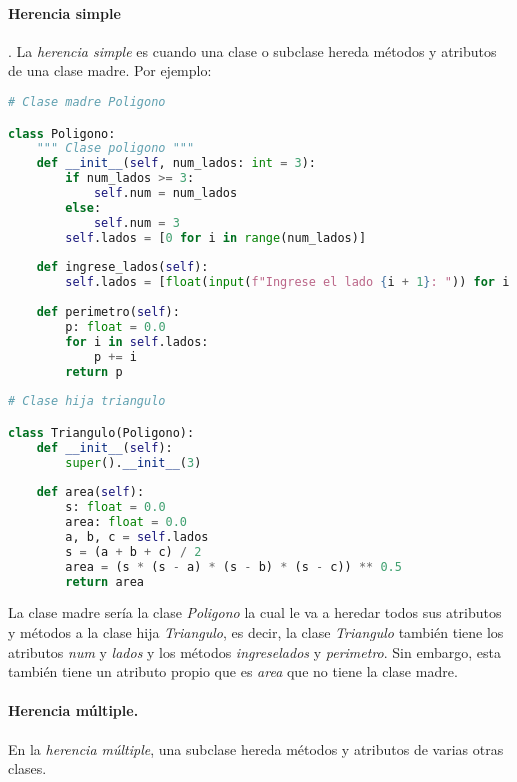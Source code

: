    \paragraph{Herencia simple}. La \emph{herencia simple} es cuando una clase o subclase hereda métodos y atributos de una clase madre. Por ejemplo:
    \begin{lstlisting}[language = {python}]
# Clase madre Poligono

class Poligono:
    """ Clase poligono """
    def __init__(self, num_lados: int = 3):
        if num_lados >= 3:
            self.num = num_lados
        else:
            self.num = 3
        self.lados = [0 for i in range(num_lados)]
        
    def ingrese_lados(self):
        self.lados = [float(input(f"Ingrese el lado {i + 1}: ")) for i in range(self.num)]
        
    def perimetro(self):
        p: float = 0.0
        for i in self.lados:
            p += i
        return p
        
# Clase hija triangulo

class Triangulo(Poligono):
    def __init__(self):
        super().__init__(3)
        
    def area(self):
        s: float = 0.0
        area: float = 0.0
        a, b, c = self.lados
        s = (a + b + c) / 2
        area = (s * (s - a) * (s - b) * (s - c)) ** 0.5
        return area
    \end{lstlisting}
    La clase madre sería la clase \emph{Poligono} la cual le va a heredar todos sus atributos y métodos a la clase hija \emph{Triangulo}, es decir, la clase \emph{Triangulo} también tiene los atributos \emph{num} y \emph{lados} y los métodos \emph{ingrese\textunderscore lados} y \emph{perimetro}. Sin embargo, esta también tiene un atributo propio que es \emph{area} que no tiene la clase madre.
    \paragraph{Herencia múltiple.} En la \emph{herencia múltiple}, una subclase hereda métodos y atributos de varias otras clases. 
